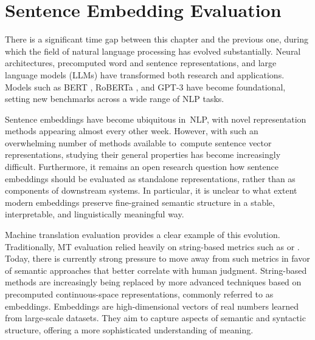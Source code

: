\chapter{Sentence Embedding Evaluation}
\label{chapter:sentence_embeddings_evaluation}

There is a significant time gap between this chapter and the previous one, during which the field of natural language processing has evolved substantially. Neural architectures, precomputed word and sentence representations, and large language models (LLMs) have transformed both research and applications. Models such as BERT \citep{bert}, RoBERTa \citep{roberta}, and GPT-3 \citep{gpt3} have become foundational, setting new benchmarks across a wide range of NLP tasks. 

Sentence embeddings have become ubiquitous in~NLP, with novel representation methods appearing almost every other week. However, with such an overwhelming number of methods available to~compute sentence vector representations, studying their general properties has become increasingly difficult. Furthermore, it remains an open research question how sentence embeddings should be evaluated as standalone representations, rather than as components of downstream systems. In particular, it is unclear to what extent modern embeddings preserve fine-grained semantic structure in a stable, interpretable, and linguistically meaningful way.

Machine translation evaluation provides a clear example of this evolution. Traditionally, MT evaluation relied heavily on string-based metrics such as \bleu or \ter. 
Today, there is currently strong pressure to move away from such metrics \citep{mathur-etal-2020-tangled, freitag-etal-2022-results} in favor of semantic approaches that better correlate with human judgment. String-based methods are increasingly being replaced by more advanced techniques based on precomputed continuous-space representations, commonly referred to as embeddings. Embeddings are high-dimensional vectors of real numbers learned from large-scale datasets. They aim to capture aspects of semantic and syntactic structure, offering a more sophisticated understanding of meaning.

